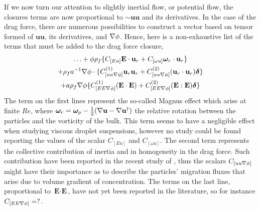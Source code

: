 If we now turn our attention to slightly inertial flow, or potential flow, the closures terms are now proportional to $\sim \textbf{uu}$ and its derivatives. 
In the case of the drag force, there are numerous possibilities to construct a vector based on tensor formed of $\textbf{uu}$, its derivatives, and $\mathbf{\nabla} \phi$. 
Hence, here is a non-exhaustive list of the terms that must be added to the drag force closure, 
\begin{multline}
    \ldots
    + \phi \rho_f \{  C_{[E u]} \textbf{E} \cdot \textbf{u}_{r} 
    + C_{[\omega u]} \bm\omega_r \cdot \textbf{u}_{r} \}\\
    + \rho_f a^{-1}  \mathbf{\nabla}\phi \cdot \{ C_{[uu\mathbf{\nabla}\phi]}^{(1)} \textbf{u}_{r}\textbf{u}_{r}
    +  C_{[uu\mathbf{\nabla}\phi]}^{(2)} (\textbf{u}_{r}\cdot \textbf{u}_{r})\bm\delta\} \\
    + a \rho_f \mathbf{\nabla}\phi \{ C_{[EE\mathbf{\nabla}\phi]}^{(1)} (\textbf{E} \cdot  \textbf{E}) 
    +  C_{[EE\mathbf{\nabla}\phi]}^{(2)} (\textbf{E} : \textbf{E})\bm\delta \}
\end{multline}
The term on the first lines represent the so-called Magnus effect which arise at finite $Re$, where $\bm\omega_r = \bm\omega_p - \frac{1}{2}(\mathbf{\nabla} \textbf{u}-\mathbf{\nabla} \textbf{u}^\dagger)$ the relative rotation between the particles and the vorticity of the bulk. 
This term seems to have a negligible effect when studying viscous droplet suspensions, however no study could be found reporting the values of the scalar $C_{[Eu]}$  and $C_{[\omega u]}$. 
The second term represents the collective contribution of inertia and in homogeneity in the drag force. 
Such contribution have been reported in the recent study of \citet{wang2024effect}, thus the scalars $C_{[uu\mathbf{\nabla}\phi]}$ might have their importance as to describe the particles' migration fluxes that arise due to volume gradient of concentration. 
The terms on the last line, proportional to $\textbf{E}\cdot \textbf{E}$, have not yet been reported in the literature, so for instance $C_{[EE\mathbf{\nabla}\phi]} = ?$. 



